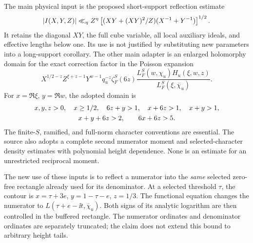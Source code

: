 The main physical input is the proposed short-support reflection estimate
\begin{equation}\label{eq:short-reflection-contract}
 \lvert I(X,Y,Z)\rvert\ll_\eta Z^\eta
       \left[(XY+(XY)^2/Z)(X^{-1}+Y^{-1})\right]^{1/2}.
\end{equation}
It retains the diagonal $XY$, the full cube variable, all local auxiliary ideals, and effective lengths below one. Its use is not justified by substituting new parameters into a long-support corollary. The other main adapter is an enlarged holomorphy domain for the exact correction factor in the Poisson expansion
\[
 X^{1/2-z}Z^{\xi+z-1}Y^{w-1}q_u^{-z}\zeta_F^S(6z)
          \frac{L_F^S(w,\chi_u)H_u(\xi,w,z)}{L_F^S(\xi,\overline\chi_u)}.
\]
For $x=\Re\xi$, $y=\Re w$, the adopted domain is
\begin{gather}\label{eq:correction-domain}
 x,y,z>0,\quad x\ge1/2,\quad 6z+y>1,\quad x+6z>1,\quad x+y>1,\notag\\
 x+y+6z>2,\qquad 6x+6z>5.
\end{gather}
The finite-$S$, ramified, and full-norm character conventions are essential. The source also adopts a complete second numerator moment and selected-character density estimates with polynomial height dependence. None is an estimate for an unrestricted reciprocal moment.

The new use of these inputs is to reflect a numerator into the \emph{same} selected zero-free rectangle already used for its denominator. At a selected threshold $\tau$, the contour is $x=\tau+3e$, $y=1-\tau-e$, $z=1/3$. The functional equation changes the numerator to $L(\tau+e-\ii t,\overline\chi_u)$. Both signs of its analytic logarithm are then controlled in the buffered rectangle. The numerator ordinates and denominator ordinates are separately truncated; the claim does not extend this bound to arbitrary height tails.

